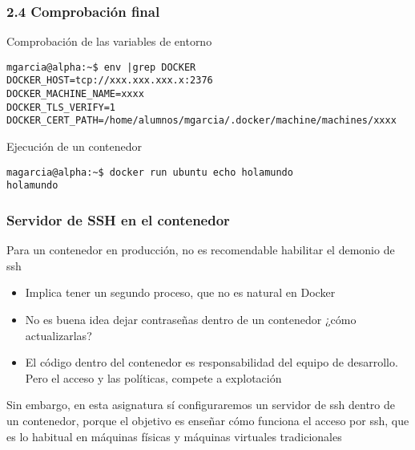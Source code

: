 \documentclass[ucs]{beamer}
\begin{document}
\begin{frame}[fragile]
\frametitle{2.4 Comprobación final}

Comprobación de las variables de entorno

  \begin{scriptsize}
  \begin{verbatim}
mgarcia@alpha:~$ env |grep DOCKER
DOCKER_HOST=tcp://xxx.xxx.xxx.x:2376
DOCKER_MACHINE_NAME=xxxx 
DOCKER_TLS_VERIFY=1
DOCKER_CERT_PATH=/home/alumnos/mgarcia/.docker/machine/machines/xxxx
  \end{verbatim}
  \end{scriptsize}


Ejecución de un contenedor


  \begin{scriptsize}
  \begin{verbatim}
magarcia@alpha:~$ docker run ubuntu echo holamundo
holamundo
  \end{verbatim}
  \end{scriptsize}


\end{frame}




\begin{frame}[fragile]
\frametitle{Servidor de SSH en el contenedor}
Para un contenedor en producción, no es recomendable habilitar 
el demonio de ssh
\begin{itemize}
\item
Implica tener un segundo proceso, que no es natural en Docker

\item
No es buena idea dejar contraseñas dentro de un contenedor
¿cómo actualizarlas?

\item
El código dentro del contenedor es responsabilidad del equipo de desarrollo.
Pero el acceso y las políticas, compete a explotación
\end{itemize}


Sin embargo, en esta asignatura sí configuraremos un servidor de ssh dentro de un contenedor, 
porque el objetivo es enseñar
cómo funciona el acceso por ssh, que es lo habitual en máquinas
físicas y máquinas virtuales tradicionales


\end{frame}
\end{document}
